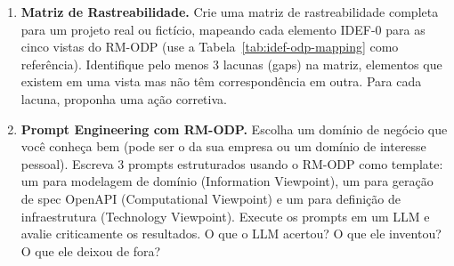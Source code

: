 \begin{enumerate}
    \item \textbf{Matriz de Rastreabilidade.}
    Crie uma matriz de rastreabilidade completa para um projeto real ou
    fictício, mapeando cada elemento IDEF-0 para as cinco vistas do
    RM-ODP (use a Tabela~\ref{tab:idef-odp-mapping} como referência).
    Identifique pelo menos 3 lacunas (gaps) na matriz, elementos que
    existem em uma vista mas não têm correspondência em outra. Para cada
    lacuna, proponha uma ação corretiva.

    \item \textbf{Prompt Engineering com RM-ODP.}
    Escolha um domínio de negócio que você conheça bem (pode ser o da sua
    empresa ou um domínio de interesse pessoal). Escreva 3 prompts
    estruturados usando o RM-ODP como template: um para modelagem de
    domínio (Information Viewpoint), um para geração de spec OpenAPI
    (Computational Viewpoint) e um para definição de infraestrutura
    (Technology Viewpoint). Execute os prompts em um LLM e avalie
    criticamente os resultados. O que o LLM acertou? O que ele inventou?
    O que ele deixou de fora?
\end{enumerate}
